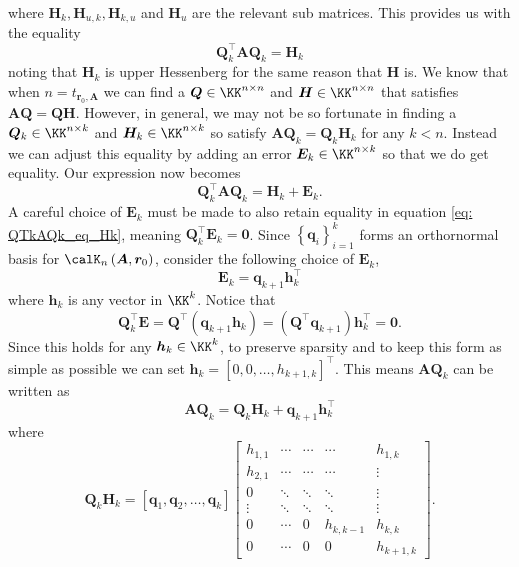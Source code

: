 where $\bm{H}_k , \bm{H}_{u,k}, \bm{H}_{k,u}$ and $\bm{H}_u$ are the relevant sub matrices. This provides us with the equality
\begin{equation}\label{eq: QTkAQk_eq_Hk}
    \bm{Q}_{k}^{\intercal} \bm{A} \bm{Q}_{k} = \bm{H}_k
\end{equation}
noting that $\bm{H}_{k}$ is upper Hessenberg for the same reason that $\bm{H}$ is. We know that when $n = t_{\bm{r}_0, \bm{A}}$ we can find a $\bm{Q} \in \KK^{n \times n}$ and $\bm{H} \in \KK^{n \times n}$ that satisfies $\bm{A} \bm{Q} = \bm{Q} \bm{H}$. However, in general, we may not be so fortunate in finding a $\bm{Q}_{k} \in \KK^{n \times k}$ and $\bm{H}_{k} \in \KK^{n \times k}$ so satisfy $\bm{A} \bm{Q}_{k} = \bm{Q}_{k} \bm{H}_k$ for any $k < n$. Instead we can adjust this equality by adding an error $\bm{E}_k \in \KK^{n \times k}$ so that we do get equality. Our expression now becomes
\begin{equation}\label{eq: QTkAQk_eq_HkEk}
    \bm{Q}_{k}^{\intercal} \bm{A} \bm{Q}_{k} = \bm{H}_k + \bm{E}_k.
\end{equation}
A careful choice of $\bm{E}_k$ must be made to also retain equality in equation \ref{eq: QTkAQk_eq_Hk}, meaning $\bm{Q}_{k}^{\intercal} \bm{E}_k = \bm{0}$. Since $\left\{ \bm{q}_i \right\}_{i=1}^{k}$ forms an orthornormal basis for $\calK_{n} \left( \bm{A}, \bm{r}_0 \right)$, consider the following choice of $\bm{E}_k$,
\[
    \bm{E}_k = \bm{q}_{k+1} \bm{h}_{k}^{\intercal}
\]
where $\bm{h}_k$ is any vector in $\KK^{k}$. Notice that
\[
    \bm{Q}_{k}^{\intercal} \bm{E} = \bm{Q}^{\intercal} \left( \bm{q}_{k+1} \bm{h}_k \right) = \left( \bm{Q}^{\intercal} \bm{q}_{k+1} \right) \bm{h}_{k}^{\intercal} = \bm{0}.
\]
Since this holds for any $\bm{h}_k \in \KK^{k}$, to preserve sparsity and to keep this form as simple as possible we can set $\bm{h}_k = \left[ 0,0, \ldots , h_{k+1,k} \right]^{\intercal}$. This means $\bm{A} \bm{Q}_k$ can be written as
\begin{equation}\label{eq: QTkAQk_eq_Hk_p_qkhk}
    \bm{A} \bm{Q}_k =  \bm{Q}_k \bm{H}_k + \bm{q}_{k+1} \bm{h}_{k}^{\intercal}
\end{equation}
where
\[
    \bm{Q}_k \bm{H}_k =
    \left[ \bm{q}_1 , \bm{q}_2 , \ldots , \bm{q}_k \right]
    \begin{bmatrix}
        h_{1,1} & \cdots & \cdots & \cdots    & h_{1,k}   \\
        h_{2,1} & \cdots & \cdots & \cdots    & \vdots    \\
        0       & \ddots & \ddots & \ddots    & \vdots    \\
        \vdots  & \ddots & \ddots & \ddots    & \vdots    \\
        0       & \cdots & 0      & h_{k,k-1} & h_{k,k}   \\
        0       & \cdots & 0      & 0         & h_{k+1,k}
    \end{bmatrix}.
\]

